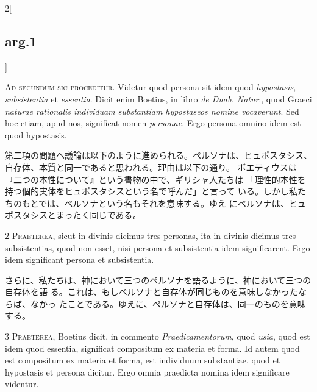 \documentclass[paper=a4paper,fontsize=10pt,jafontsize=9pt,titlepage]{jlreq}
\begin{document}
\begin{paracol}{2}[\subsection{arg.1}]

{\Huge A}{\scshape d secundum sic proceditur}. Videtur quod persona sit idem quod
{\itshape hypostasis}, {\itshape subsistentia} et {\itshape essentia}. Dicit enim Boetius, in libro {\itshape de
Duab. Natur}., quod Graeci {\itshape naturae rationalis individuam substantiam
hypostaseos nomine vocaverunt}. Sed hoc etiam, apud nos, significat nomen
{\itshape personae}. Ergo persona omnino idem est quod hypostasis.

\switchcolumn

第二項の問題へ議論は以下のように進められる。ペルソナは、ヒュポスタシス、
 自存体、本質と同一であると思われる。理由は以下の通り。
ボエティウスは『二つの本性について』という書物の中で、ギリシャ人たちは
 「理性的本性を持つ個的実体をヒュポスタシスという名で呼んだ」と言って
 いる。しかし私たちのもとでは、ペルソナという名もそれを意味する。ゆえ
 にペルソナは、ヒュポスタシスとまったく同じである。


2 {\scshape Praeterea}, sicut in divinis dicimus tres personas, ita in divinis
dicimus tres subsistentias, quod non esset, nisi persona et subsistentia
idem significarent. Ergo idem significant persona et subsistentia.

\switchcolumn

さらに、私たちは、神において三つのペルソナを語るように、神において三つの自存体を語
 る。これは、もしペルソナと自存体が同じものを意味しなかったならば、なかっ
 たことである。ゆえに、ペルソナと自存体は、同一のものを意味する。


3 {\scshape Praeterea}, Boetius dicit, in commento {\itshape Praedicamentorum}, quod {\itshape usia}, quod
est idem quod essentia, significat compositum ex materia et forma. Id
autem quod est compositum ex materia et forma, est individuum
substantiae, quod et hypostasis et persona dicitur. Ergo omnia praedicta
nomina idem significare videntur.


\end{paracol}
\end{document}
